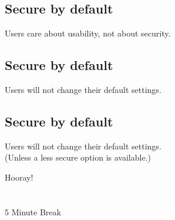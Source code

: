 \documentclass[xga]{xdvislides}
\begin{document}
\subsection{Secure by default}
\vspace{.5in}
\Huge
\begin{center}
Users care about usability, not about security.
\end{center}
\Normalsize

\subsection{Secure by default}
\vspace{.5in}
\Huge
\begin{center}
Users will not change their default settings.
\end{center}
\Normalsize

\subsection{Secure by default}
\vspace{.5in}
\Huge
\begin{center}
Users will not change their default settings. \\
\Normalsize
(Unless a less secure option is available.)
\end{center}

\newpage
\vspace*{\fill}
\begin{center}
    \Hugesize
        Hooray! \\ [1em]
    \hspace*{5mm}
    \blueline\\
    \hspace*{5mm}\\
        5 Minute Break
\end{center}
\vspace*{\fill}
\end{document}
